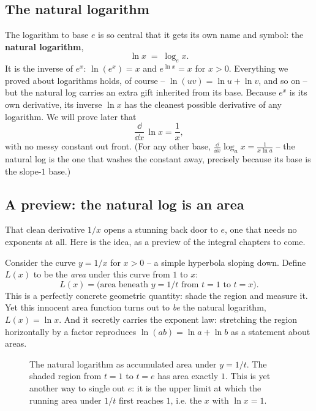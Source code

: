 \subsection{The natural logarithm}

The logarithm to base $e$ is so central that it gets its own name and symbol: the \textbf{natural logarithm},
\[
\ln x \;=\; \log_e x.
\]
It is the inverse of $e^x$: $\ln(e^x)=x$ and $e^{\ln x}=x$ for $x>0$. Everything we proved about logarithms holds, of course -- $\ln(uv)=\ln u+\ln v$, and so on -- but the natural log carries an extra gift inherited from its base. Because $e^x$ is its own derivative, its inverse $\ln x$ has the cleanest possible derivative of any logarithm. We will prove later that
\[
\frac{\dd}{\dd x}\,\ln x = \frac{1}{x},
\]
with no messy constant out front. (For any other base, $\frac{\dd}{\dd x}\log_a x = \frac{1}{x\ln a}$ -- the natural log is the one that washes the constant away, precisely because its base is the slope-$1$ base.)

\subsection{A preview: the natural log is an area}

That clean derivative $1/x$ opens a stunning back door to $e$, one that needs no exponents at all. Here is the idea, as a preview of the integral chapters to come.

Consider the curve $y=1/x$ for $x>0$ -- a simple hyperbola sloping down. Define $L(x)$ to be the \emph{area} under this curve from $1$ to $x$:
\[
L(x) = \text{(area beneath } y=1/t \text{ from } t=1 \text{ to } t=x).
\]
This is a perfectly concrete geometric quantity: shade the region and measure it. Yet this innocent area function turns out to \emph{be} the natural logarithm, $L(x)=\ln x$. And it secretly carries the exponent law: stretching the region horizontally by a factor reproduces $\ln(ab)=\ln a + \ln b$ as a statement about areas.

\begin{figure}[H]
\centering
{}
\caption{The natural logarithm as accumulated area under $y=1/t$. The shaded region from $t=1$ to $t=e$ has area exactly $1$. This is yet another way to single out $e$: it is the upper limit at which the running area under $1/t$ first reaches $1$, i.e. the $x$ with $\ln x = 1$.}
\label{ch03:fig-area-log}
\end{figure}

